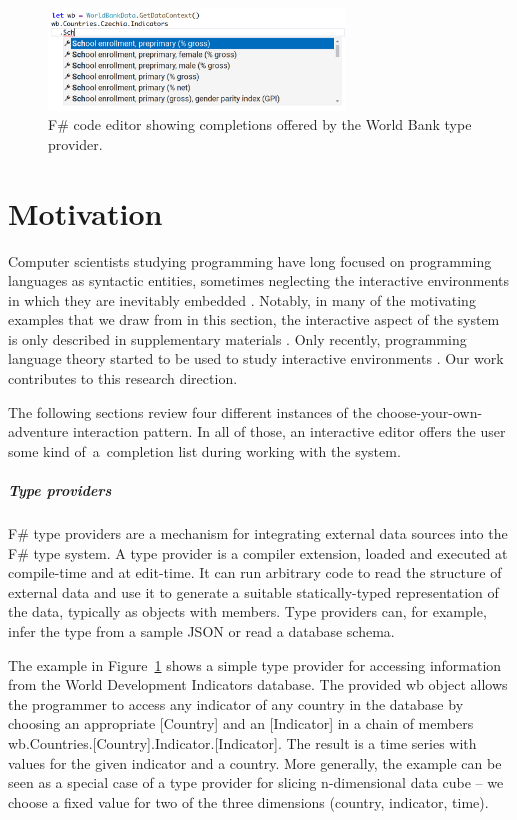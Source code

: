 \documentclass[a4paper,UKenglish,cleveref, autoref, thm-restate]{lipics-v2021}
\newcommand{\ident}[1]{\textsf{#1}}
\begin{document}
\newpage

\begin{figure}[t]
  \includegraphics[width=0.7\textwidth]{fig/worldbank.png}
  \caption{F\# code editor showing completions offered by the World Bank type provider.}
  \label{fig:worldbank}
\end{figure}

\section{Motivation}
\label{sec:motivation}

Computer scientists studying programming have long focused on programming languages as syntactic
entities, sometimes neglecting the interactive environments in which they are inevitably
embedded \cite{rpg-2012-revolution}. Notably, in many of the motivating examples that we draw
from in this section, the interactive aspect of the system is only described in supplementary
materials \cite{brady-2015-idris,syme-2013-inforich,altenkirch-1994-alf}. Only recently, programming
language theory started to be used to study interactive environments
\cite{adams-2025-grove,mayer-2018-bidirectional}. Our work contributes to this research direction.

The following sections review four different instances of the choose-your-own-adventure
interaction pattern. In all of those, an interactive editor offers the user some kind of~a~com\-pletion list during working with the system.

\subparagraph{Type providers}

F\# type providers \cite{syme-2013-inforich} are a mechanism for integrating external data
sources into the F\# type system. A type provider is a compiler extension, loaded and
executed at compile-time and at edit-time. It can run arbitrary code to read the structure of
external data and use it to generate a suitable statically-typed representation of the
data, typically as objects with members. Type providers can, for example, infer the type from a
sample JSON \cite{petricek-2016-fsdata} or read a database schema.

The example in Figure~\ref{fig:worldbank} shows a simple type provider for accessing information
from the World Development Indicators database. The provided \ident{wb} object allows the programmer
to access any indicator of any country in the database by choosing an appropriate \ident{[Country]}
and an \ident{[Indicator]} in a chain of members
\ident{wb}.\ident{Countries}.\ident{[Country]}.\ident{Indicator}.\ident{[Indicator]}.
The result is a time series with values for the given indicator and a country. More generally,
the example can be seen as a special case of a type provider for slicing n-dimensional
data cube \cite{petricek-2022-thegamma} -- we choose a fixed value for two of the three
dimensions (country, indicator, time).
\end{document}

